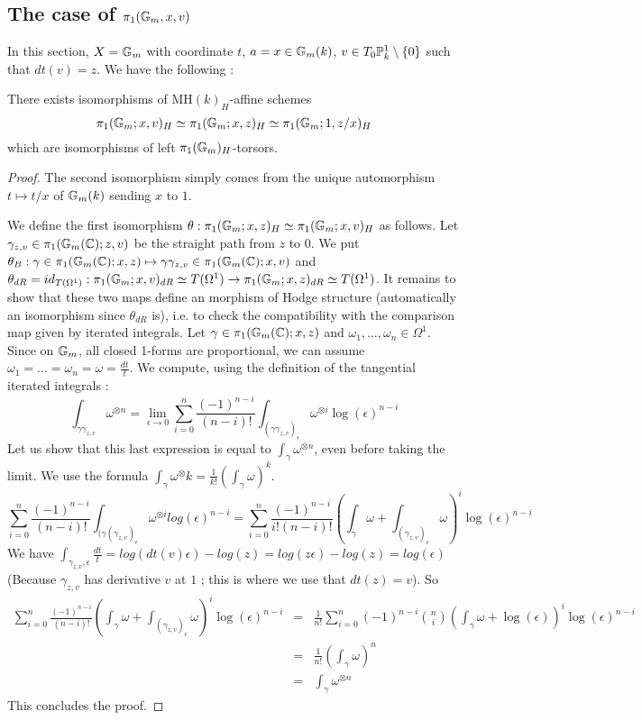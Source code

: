 \subsection{The case of $\pi_1(\mathbb{G}_m,x,v)$}
In this section, $X=\mathbb{G}_m$ with coordinate $t$, $a=x\in \mathbb{G}_m(k)$, $v\in T_0\mathbb{P}^1_k\setminus\{0\}$ such that $dt(v)=z$. We have the following :
\begin{prop}
\label{pi_1_Gm}
There exists isomorphisms of $\mathrm{MH}(k)_H$-affine schemes
\[
\pi_1(\mathbb{G}_m;x,v)_H\simeq \pi_1(\mathbb{G}_m;x,z)_H\simeq \pi_1(\mathbb{G}_m;1,z/x)_H
\]
which are isomorphisms of left $\pi_1(\mathbb{G}_m)_H$-torsors.
\end{prop}
\begin{proof}
The second isomorphism simply comes from the unique automorphism $t\mapsto t/x$ of $\mathbb{G}_m(k)$ sending $x$ to $1$.

We define the first isomorphism $\theta:\pi_1(\mathbb{G}_m;x,z)_H\simeq \pi_1(\mathbb{G}_m;x,v)_H$ as follows. Let $\gamma_{z,v}\in\pi_1(\mathbb{G}_m(\mathbb{C});z,v)$ be the straight path from $z$ to $0$. We put $\theta_B:\gamma\in \pi_1(\mathbb{G}_m(\mathbb{C});x,z)\mapsto \gamma\gamma_{z,v}\in\pi_1(\mathbb{G}_m(\mathbb{C});x,v)$ and $\theta_{dR}=id_{T(\Omega^1)}:\pi_1(\mathbb{G}_m;x,v)_{dR}\simeq T(\Omega^1)\rightarrow \pi_1(\mathbb{G}_m;x,z)_{dR}\simeq T(\Omega^1)$. It remains to show that these two maps define an morphism of Hodge structure (automatically an isomorphism since $\theta_{dR}$ is), i.e. to check the compatibility with the comparison map given by iterated integrals. Let $\gamma\in \pi_1(\mathbb{G}_m(\mathbb{C});x,z)$ and $\omega_1,\ldots,\omega_n\in \Omega^1$. Since on $\mathbb{G}_m$, all closed 1-forms are proportional, we can assume $\omega_1=\ldots=\omega_n=\omega=\frac{dt}{t}$. We compute, using the definition of the tangential iterated integrals :
\[
\int_{\gamma\gamma_{z,v}}\omega^{\otimes n} = \lim_{\epsilon\rightarrow 0}\sum_{i=0}^n\frac{(-1)^{n-i}}{(n-i)!}\int_{(\gamma\gamma_{z,v})_\epsilon}\omega^{\otimes i} \log(\epsilon)^{n-i}
\]
Let us show that this last expression is equal to $\int_{\gamma}\omega^{\otimes n}$, even before taking the limit. We use the formula $\int_\gamma\omega^\otimes k=\frac{1}{k!}(\int_\gamma\omega)^k$.
\[
\sum_{i=0}^n\frac{(-1)^{n-i}}{(n-i)!}\int_{(\gamma(\gamma_{z,v})_\epsilon}\omega^{\otimes i} log(\epsilon)^{n-i} = \sum_{i=0}^n\frac{(-1)^{n-i}}{i!(n-i)!}\left(\int_{\gamma}\omega +\int_{(\gamma_{z,v})_\epsilon}\omega\right)^i \log(\epsilon)^{n-i}
\]
We have $\int_{\gamma_{z,v},\epsilon}\frac{dt}{t}=log(dt(v)\epsilon)-log(z)=log(z\epsilon)-log(z)=log(\epsilon)$ (Because $\gamma_{z,v}$ has derivative $v$ at $1$ ; this is where we use that $dt(z)=v$). So 
\begin{eqnarray*}
\sum_{i=0}^n\frac{(-1)^{n-i}}{(n-i)!}(\int_{\gamma}\omega +\int_{(\gamma_{z,v})_\epsilon}\omega)^i \log(\epsilon)^{n-i} & = & \frac{1}{n!}\sum_{i=0}^n(-1)^{n-i}\binom{n}{i}\left(\int_{\gamma}\omega+\log(\epsilon)\right)^i\log(\epsilon)^{n-i}\\
& = & \frac{1}{n!}(\int_{\gamma}\omega)^n\\
& = & \int_{\gamma}\omega^{\otimes n}
\end{eqnarray*}
This concludes the proof.
\end{proof}

